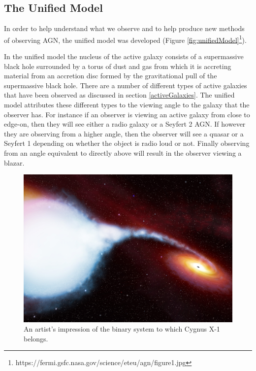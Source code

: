 \documentclass[12pt, oneside]{smuthesis}
\begin{document}
\subsection{\sc The Unified Model} \label{unifiedModel}

In order to help understand what we observe and to help produce new methods of observing AGN, the unified model was developed (Figure \ref{fig:unifiedModel}\footnote{https://fermi.gsfc.nasa.gov/science/eteu/agn/figure1.jpg}). 

In the unified model the nucleus of the active galaxy consists of a supermassive black hole surrounded by a torus of dust and gas from which it is accreting material from an accretion disc formed by the gravitational pull of the supermassive black hole. There are a number of different types of active galaxies that have been observed as discussed in section \ref{activeGalaxies}. The unified model attributes these different types to the viewing angle to the galaxy that the observer has. For instance if an observer is viewing an active galaxy from close to edge-on, then they will see either a radio galaxy or a Seyfert 2 AGN. If however they are observing from a higher angle, then the observer will see a quasar or a Seyfert 1 depending on whether the object is radio loud or not. Finally observing from an angle equivalent to directly above will result in the observer viewing a blazar.

\begin{figure}[H]
	\centering
	\begin{minipage}{0.6\linewidth}
		\centering
		\includegraphics[width=0.8\linewidth]{CygX1}
		\caption{An artist's impression of the binary system to which Cygnus X-1 belongs.}
		\label{fig:CygX1}
	\end{minipage}
\end{figure}
\end{document}

